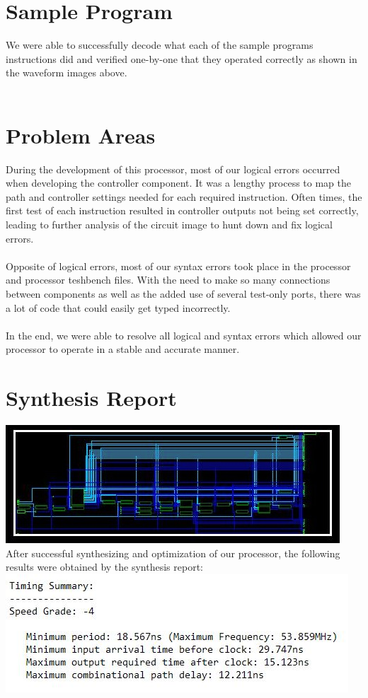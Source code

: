 \documentclass{article}
\begin{document}
\section{Sample Program}

	We were able to successfully decode what each of the sample programs instructions did and verified one-by-one that they operated correctly as shown in the waveform images above.\\ \\
	
\section{Problem Areas}

	During the development of this processor, most of our logical errors occurred when developing the controller component. It was a lengthy process to map the path and controller settings needed for each required instruction. Often times, the first test of each instruction resulted in controller outputs not being set correctly, leading to further analysis of the circuit image to hunt down and fix logical errors.\\ \\
	Opposite of logical errors, most of our syntax errors took place in the processor and processor tesh\-bench files. With the need to make so many connections between components as well as the added use of several test-only ports, there was a lot of code that could easily get typed incorrectly.\\ \\
	In the end, we were able to resolve all logical and syntax errors which allowed our processor to operate in a stable and accurate manner.

\section{Synthesis Report}
\includegraphics[width=1\columnwidth]{RTLSchematic.JPG}
	After successful synthesizing and optimization of our processor, the following results were obtained by the synthesis report: \\
\includegraphics[width=1\columnwidth]{SynthesisReport.JPG}
\end{document}

